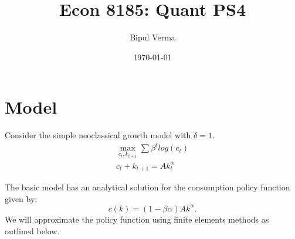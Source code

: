 \documentclass[12pt]{article}
\begin{document}

\title{Econ 8185: Quant PS4}
\author{Bipul Verma}
\date{\today}
\maketitle


\vspace{8cm}



\newpage

\section{Model}
Consider the simple neoclassical growth model with $\delta = 1$. 
\begin{align*}
\max_{c_t, k_{t+1}} \sum \beta^t log(c_t) \\
c_t + k_{t+1} = A k_t^{\alpha}
\end{align*}

The basic model has an analytical solution for the consumption policy function given by: $$c(k) = (1-\beta \alpha)Ak^{\alpha}.$$ We will approximate the policy function using finite elements methods as outlined below.
\end{document}
